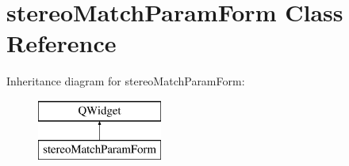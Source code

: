 \hypertarget{classstereo_match_param_form}{}\section{stereo\+Match\+Param\+Form Class Reference}
\label{classstereo_match_param_form}
Inheritance diagram for stereo\+Match\+Param\+Form\+:\begin{figure}[H]
\begin{center}
\leavevmode
\includegraphics[height=2.000000cm]{classstereo_match_param_form}
\end{center}
\end{figure}

